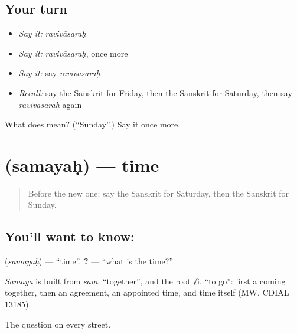 \subsection*{Your turn}
\begin{itemize}
\raggedright
  \item \emph{Say it:} \emph{ravivāsaraḥ}
  \item \emph{Say it:} \emph{ravivāsaraḥ}, once more
  \item \emph{Say it:} say \emph{ravivāsaraḥ}
  \item \emph{Recall:} say the Sanskrit for Friday, then the Sanskrit for Saturday, then say \emph{ravivāsaraḥ} again
\end{itemize}

\begin{tcolorbox}[breakable,colback=teal!4,colframe=teal!35!black,title={Before you move on}]
What does  mean? (\textquotedblleft{}Sunday\textquotedblright{}.) Say it once more.
\end{tcolorbox}
\section[\texorpdfstring{\sk{समयः} (samayaḥ)}{समयः (samayaḥ)}]{ (samayaḥ) — time}

\label{lesson:SA-C86-time}



\begin{quote}
Before the new one: say the Sanskrit for Saturday, then the Sanskrit for Sunday.
\end{quote}

\subsection*{You'll want to know: }
\textbf{} (\emph{samayaḥ}) — \textquotedblleft{}time\textquotedblright{}. \textbf{ ?} — \textquotedblleft{}what is the time?\textquotedblright{}

\begin{cousinweb}
\emph{Samaya} is built from \emph{sam}, \textquotedblleft{}together\textquotedblright{}, and the root √i, \textquotedblleft{}to go\textquotedblright{}: first a coming together, then an agreement, an appointed time, and time itself (MW, CDIAL 13185).
\end{cousinweb}

\begin{grammarlens}[title={What you've built}]
The question on every street.
\end{grammarlens}

